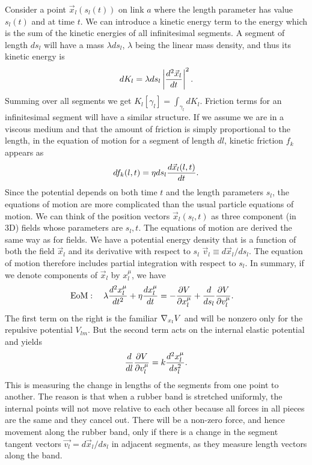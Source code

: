 \documentclass[endfloats,nofootinbib,preprint,floatfix,titlepage,superscriptaddress]{revtex4} %
\begin{document}
Consider a point $\vec{x}_l(s_l(t))$ on link $a$ where the length parameter has value $s_l(t)$ and at time $t$. We can introduce a kinetic energy term to the energy which is the sum of the kinetic energies of all infinitesimal segments.
A segment of length $ds_l$ will have a mass $\lambda ds_l $, $\lambda$ being the linear mass density, and thus its kinetic energy is
\[dK_l = \lambda ds_l \left|d^2 \vec{x}_l \over dt \right|^2.\]
Summing over all segments we get $K_l[\gamma_l] = \int_{\gamma_l} dK_l$. Friction terms for an infinitesimal segment will have a similar structure. If we assume we are in a viscous medium and that the amount of friction is simply proportional to the length, in the equation of motion for a segment of length $dl$, kinetic friction $f_k$ appears as 
\[df_k(l,t) =\eta ds_l {d\vec{x}_l(l,t)\over dt}.\] 
Since the potential depends on both time $t$ and the length parameters $s_l$, the equations of motion are more complicated than the usual particle equations of motion. 
We can think of the position vectors $\vec{x}_l (s_l,t)$ as three component (in 3D) fields whose parameters are $s_l,t$. 
The equations of motion are derived the same way as for fields. 
We have a potential energy density that is a function of both the field $\vec{x}_l$ and its derivative with respect to $s_l$  $\vec{v}_l \equiv d\vec{x}_l/ds_l$. 
The equation of motion therefore includes partial integration with respect to $s_l$. 
In summary, if we denote components of $\vec{x}_l$ by $x_l^\mu$, we have 
\begin{align}
    \mbox{EoM}:\quad \lambda {d^2 x_l^\mu \over dt^2} +\eta {dx_l^\mu \over dt} & =  -{\partial V \over \partial x_l^\mu} + {d\over ds_l} {\partial V \over \partial v_l^\mu}.   \label{eq:Langevin}
\end{align}
The first term on the right is the familiar $\nabla_{x_l} V$ and will be nonzero only for the repulsive potential $V_{lm}$. But the second term acts on the internal elastic potential and yields \[{d\over dl} {\partial V \over \partial v_l^\mu} = k {d^2 x_l^\mu \over ds_l^2}.\]  
This is measuring the change in lengths of the segments from one point to another. The reason is that when a rubber band is stretched uniformly, the internal points will not move relative to each other because all forces in all pieces are the same and they cancel out. There will be a non-zero force, and hence movement along the rubber band, only if there is a change in the segment tangent vectors $\vec{v_l} = d\vec{x}_l/ds_l$ in adjacent segments, as they measure length vectors along the band.
\end{document}
